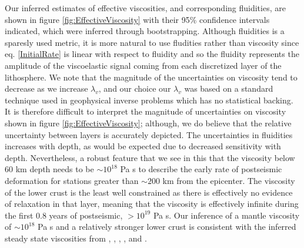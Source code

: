 \documentclass[12pt]{article}
\begin{document}
Our inferred estimates of effective viscosities, and corresponding fluidities, are shown in figure \ref{fig:EffectiveViscosity} with their 95\% confidence intervals indicated, which were inferred through bootstrapping. Although fluidities is a sparesly used metric, it is more natural to use fludities rather than viscosity since eq. \ref{InitialRate} is linear with respect to fluidity and so the fluidity represents the amplitude of the viscoelastic signal coming from each discretized layer of the lithosphere.  We note that the magnitude of the uncertainties on viscosity tend to decrease as we increase $\lambda_v$, and our choice our $\lambda_v$ was based on a standard technique used in geophysical inverse problems which has no statistical backing.  It is therefore difficult to interpret the magnitude of uncertainties on viscosity shown in figure \ref{fig:EffectiveViscosity}; although, we do believe that the relative uncertainty between layers is accurately depicted.  The uncertainties in fluidities increases with depth, as would be expected due to decreased sensitivity with depth.  Nevertheless, a robust feature that we see in this that the viscosity below 60 km depth needs to be $\sim 10^{18}$ Pa s to describe the early rate of postseismic deformation for stations greater than $\sim 200$ km from the epicenter. The viscosity of the lower crust is the least well constrained as there is effectively no evidence of relaxation in that layer, meaning that the viscosity is effectively infinite during the first 0.8 years of postseismic, $> 10^{19}$ Pa s. Our inference of a mantle viscosity of $\sim 10^{18}$ Pa s and a relatively stronger lower crust is consistent with the inferred steady state viscosities from \cite{Pollitz2000}, \cite{Pollitz2003}, \cite{Johnson2007}, \cite{Spinler2015}, and \cite{Rollins2015}.  
\end{document}
